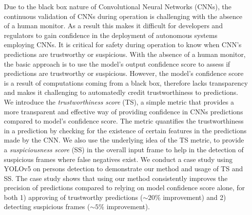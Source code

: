 Due to the black box nature of Convolutional Neural Networks (CNNs), the continuous validation of CNNs during operation is challenging with the absence of a human monitor. 
%
As a result this makes it difficult for developers and regulators to gain confidence in the deployment of autonomous systems employing CNNs.
%
It is critical for safety during operation to know when CNN's predictions are trustworthy or suspicious.  
%
With the absence of a human monitor, the basic approach is to use the model's output confidence score to assess if predictions are trustworthy or suspicious.  
%
However, the model's confidence score is a result of computations coming from a black box, therefore lacks transparency and makes it challenging to automatedly credit trustworthiness to predictions.
%
We introduce the \textit{trustworthiness score} (TS), a simple metric that provides a more transparent and effective way of providing confidence in CNNs predictions compared to model's confidence score. 
%
The metric quantifies the trustworthiness in a prediction by checking for the existence of certain features in the predictions made by the CNN. 
%
We also use the underlying idea of the TS metric, to provide a \textit{suspiciousness score} (SS) in the overall input frame to help in the detection of suspicious frames where false negatives exist.
%
We conduct a case study using YOLOv5 on persons detection to demonstrate our method and usage of TS and SS. 
%
The case study shows that using our method consistently improves the precision of predictions compared to relying on model confidence score alone, for both 1) approving of trustworthy predictions ($\sim 20\%$ improvement) and 2) detecting suspicious frames ($\sim 5\%$ improvement). 